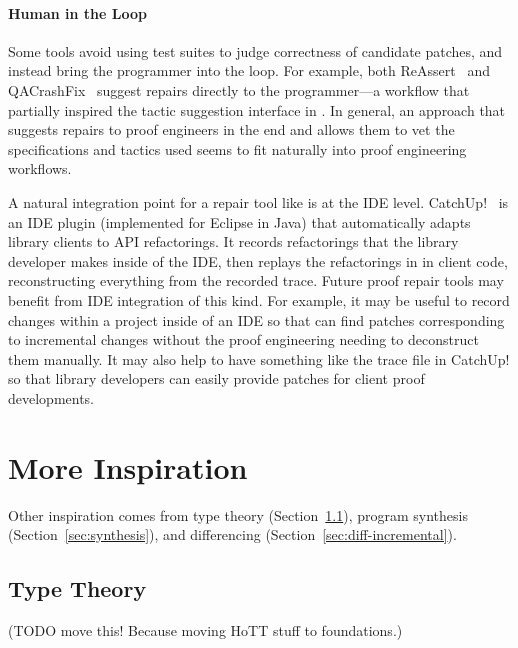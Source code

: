 \paragraph{Human in the Loop}
Some tools avoid using test suites to judge correctness of candidate patches, and instead
bring the programmer into the loop. For example, both ReAssert~\cite{daniel2009reassert}
and QACrashFix~\cite{gao2015fixing} suggest repairs directly to the programmer---a workflow
that partially inspired the tactic suggestion interface in \toolnamec.
In general, an approach that suggests repairs to proof engineers in the end
and allows them to vet the specifications and tactics used seems to fit naturally into proof engineering workflows. 

A natural integration point for a repair tool like \sysnamelong is at the IDE level. 
CatchUp!~\cite{Henkel:2005:CCR:1062455.1062512} is an IDE plugin (implemented for Eclipse in Java) that automatically adapts library clients to API refactorings.
It records refactorings that the library developer makes inside of the IDE,
then replays the refactorings in in client code, reconstructing everything from the recorded trace.
Future proof repair tools may benefit from IDE integration of this kind.
For example, it may be useful to record changes within a project inside of an IDE 
so that \sysnamelong can find patches corresponding to incremental changes without the proof engineering needing to deconstruct them manually.
It may also help to have something like the trace file in CatchUp! so that library developers can easily provide patches for client proof developments.

\iffalse
\section{More Inspiration}
\label{sec:inspiration}

Other inspiration comes from type theory (Section~\ref{sec:typetheory}),
program synthesis (Section~\ref{sec:synthesis}),
and differencing (Section~\ref{sec:diff-incremental}).


\subsection{Type Theory}
\label{sec:typetheory}

(TODO move this! Because moving HoTT stuff to foundations.)

